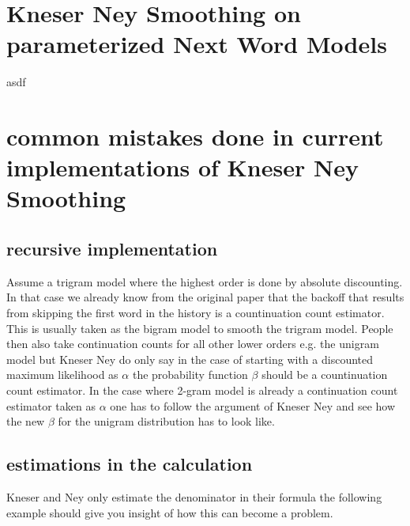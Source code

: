 \documentclass[•]{book}
\begin{document}
\begin{appendix}
\section{Kneser Ney Smoothing on parameterized Next Word Models}
 asdf

\section{common mistakes done in current implementations of Kneser Ney Smoothing}
\subsection{recursive implementation}
Assume a trigram model where the highest order is done by absolute discounting. 
In that case we already know from the original paper that the backoff that results from skipping the first word in the history is a countinuation count estimator.
This is usually taken as the bigram model to smooth the trigram model.
People then also take continuation counts for all other lower orders e.g. the unigram model but Kneser Ney do only say in the case of starting with a discounted maximum likelihood as $\alpha$ the probability function $\beta$ should be a countinuation count estimator.
In the case where 2-gram model is already a continuation count estimator taken as $\alpha$ one has to follow the argument of Kneser Ney and see how the new $\beta$ for the unigram distribution has to look like.
\subsection{estimations in the calculation}
Kneser and Ney only estimate the denominator in their formula the following example should give you insight of how this can become a problem. 

\end{appendix}
\end{document}

